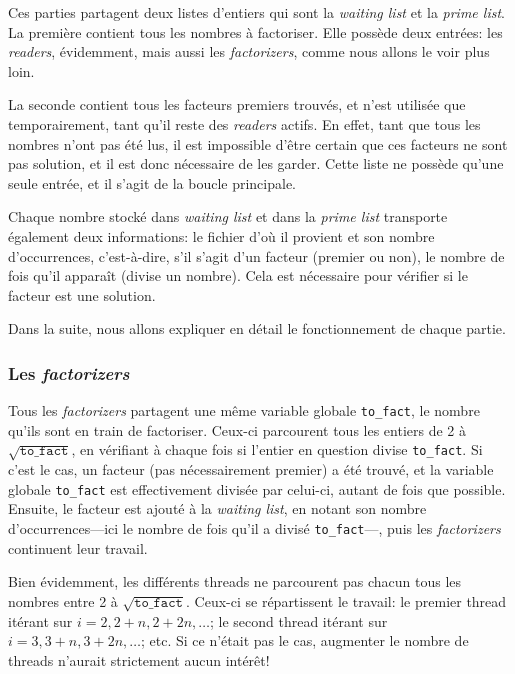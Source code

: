 \documentclass[a4paper,10pt]{article}
\begin{document}
Ces parties partagent deux listes d'entiers qui sont la \emph{waiting list} et la \emph{prime list}. La première contient tous les nombres à factoriser. Elle possède deux entrées: les \emph{readers}, évidemment, mais aussi les \emph{factorizers}, comme nous allons le voir plus loin.

La seconde contient tous les facteurs premiers trouvés, et n'est utilisée que temporairement, tant qu'il reste des \emph{readers} actifs. En effet, tant que tous les nombres n'ont pas été lus, il est impossible d'être certain que ces facteurs ne sont pas solution, et il est donc nécessaire de les garder. Cette liste ne possède qu'une seule entrée, et il s'agit de la boucle principale.

Chaque nombre stocké dans \emph{waiting list} et dans la \emph{prime list} transporte également deux informations: le fichier d'où il provient et son nombre d'occurrences, c'est-à-dire, s'il s'agit d'un facteur (premier ou non), le nombre de fois qu'il apparaît (divise un nombre). Cela est nécessaire pour vérifier si le facteur est une solution.

Dans la suite, nous allons expliquer en détail le fonctionnement de chaque partie.

\subsubsection*{Les \emph{factorizers}}

Tous les \emph{factorizers} partagent une même variable globale \texttt{to\_fact}, le nombre qu'ils sont en train de factoriser. Ceux-ci parcourent tous les entiers de 2 à $\sqrt{\texttt{to\_fact}}$, en vérifiant à chaque fois si l'entier en question divise \texttt{to\_fact}. Si c'est le cas, un facteur (pas nécessairement premier) a été trouvé, et la variable globale \texttt{to\_fact} est effectivement divisée par celui-ci, autant de fois que possible. Ensuite, le facteur est ajouté à la \emph{waiting list}, en notant son nombre d'occurrences---ici le nombre de fois qu'il a divisé \texttt{to\_fact}---, puis les \emph{factorizers} continuent leur travail.

Bien évidemment, les différents threads ne parcourent pas chacun tous les nombres entre 2 à $\sqrt{\texttt{to\_fact}}$. Ceux-ci se répartissent le travail: le premier thread itérant sur $i=2,2+n,2+2n,\dots$; le second thread itérant sur $i=3,3+n,3+2n,\dots$; etc. Si ce n'était pas le cas, augmenter le nombre de threads n'aurait strictement aucun intérêt!
\end{document}
